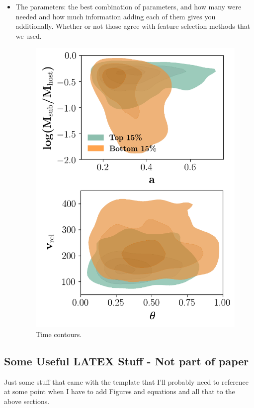 \documentclass[fleqn,usenatbib]{mnras}
\begin{document}
\begin{itemize}
	\item The parameters: the best combination of parameters, and how many were needed and how much information adding each of them gives you additionally. Whether or not those agree with feature selection methods that we used. 
\begin{figure}
	\includegraphics[width=\textwidth]{Figures/time_contours}
    \caption{Time contours.}
    \label{fig:time_contours}
\end{figure}
\end{itemize}

\subsection{Some Useful LATEX Stuff - Not part of paper}
Just some stuff that came with the template that I'll probably need to reference at some point when I have to add Figures and equations and all that to the above sections.
\end{document}
